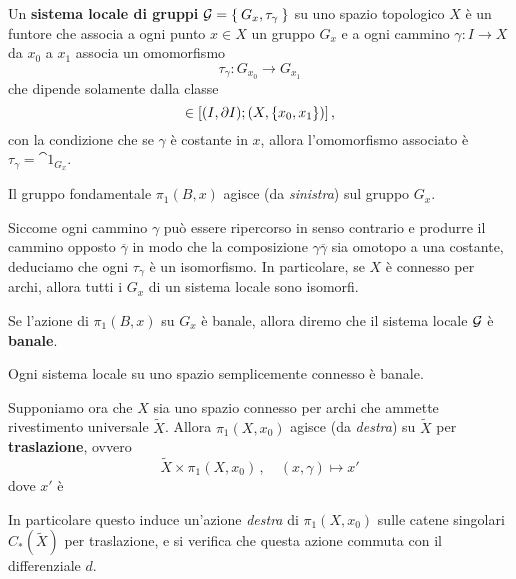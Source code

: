 \begin{df}
	Un \textbf{sistema locale di gruppi} $\mathcal{G} = \Set{G_{x},\tau_{\gamma}}$ 
	su uno spazio topologico $X$ è un funtore che associa a ogni punto $x \in X$
	un gruppo $G_{x}$ e a ogni cammino $\gamma : I \to X$ da $x_{0}$ a $x_{1}$
	associa un omomorfismo
	\begin{equation*}
		\tau_{\gamma} : G_{x_{0}} \longrightarrow G_{x_{1}}
	\end{equation*}
	che dipende solamente dalla classe
	\begin{equation*}
		[\gamma] \in [(I, \de I) ; (X, \{x_{0}, x_{1} \})]\,,
	\end{equation*}
	con la condizione che se $\gamma$ è costante in $x$, 
	allora l'omomorfismo associato è $\tau_{\gamma} = \cat{1}_{G_{x}}$.
\end{df}

\begin{oss}
	Il gruppo fondamentale $\pi_{1}(B,x)$ agisce (da \emph{sinistra})
	sul gruppo $G_{x}$.
\end{oss}


\begin{oss}
	Siccome ogni cammino $\gamma$ può essere ripercorso in senso
	contrario e produrre il cammino opposto $\overline{\gamma}$
	in modo che la composizione $\gamma \overline{\gamma}$ sia omotopo a una costante,
	deduciamo che ogni $\tau_{\gamma}$ è un isomorfismo.
	In particolare, se $X$ è connesso per archi, allora tutti i $G_{x}$
	di un sistema locale sono isomorfi.
\end{oss}

\begin{df}
	Se l'azione di $\pi_{1}(B,x)$ su $G_{x}$ è banale,
	allora diremo che il sistema locale $\mathcal{G}$ è \textbf{banale}.
\end{df}

\begin{ex}
	Ogni sistema locale su uno spazio semplicemente connesso è banale.
\end{ex}


Supponiamo ora che $X$ sia uno spazio connesso per archi
che ammette rivestimento universale $\widetilde{X}$.
Allora $\pi_{1}(X,x_{0})$ agisce (da \emph{destra})
su $\widetilde{X}$ per \textbf{traslazione}, ovvero
\begin{equation*}
	\widetilde{X} \times \pi_{1}(X,x_{0})\,, \quad
	(x,\gamma) \longmapsto x'
\end{equation*}
dove $x'$ è 

In particolare questo induce un'azione \emph{destra} di $\pi_{1}(X,x_{0})$
sulle catene singolari $C_{*}(\widetilde{X})$ per traslazione,
e si verifica che questa azione commuta con il differenziale $d$.

